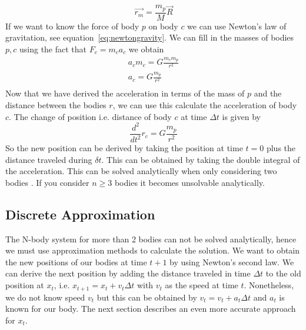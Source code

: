 \documentclass[11pt]{article} %
\begin{document}
\begin{equation}
	\overrightarrow{r_m} = \frac{m_p}{M}\overrightarrow{R}
\end{equation}
If we want to know the force of body $p$ on body $c$ we can use Newton's law of gravitation, see equation~\ref{eq:newtongravity}.  We can fill in the masses of bodies $p,c$ using the fact that $F_c = m_c a_c$ we obtain
\begin{equation}
    \begin{split}
     a_c m_c = G\frac{m_c m_p}{r^2} \\
     a_c = G\frac{m_p}{r^2} \\
    \end{split}
\end{equation}
Now that we have derived the acceleration in terms of the mass of $p$ and the distance between the bodies $r$, we can use this calculate the acceleration of body $c$. The change of position i.e. distance of body $c$ at time $\Delta t$ is given by
\begin{equation}
    \frac{d^2}{dt^2} r_c = G \frac{m_p}{r^2}
\end{equation}
So the new position can be derived by taking the position at time $t=0$ plus the distance traveled during $\delta t$. This can be obtained by taking the double integral of the acceleration. This can be solved analytically when only considering two bodies \cite{frida2013}. If you consider $n \geq 3$ bodies it becomes unsolvable analytically. 
\subsection{Discrete Approximation}
The N-body system for more than 2 bodies can not be solved analytically, hence we must use approximation methods to calculate the solution.
We want to obtain the new positions of our bodies at time $t+1$ by using Newton's second law. We can derive the next position by adding the distance traveled in time $\Delta t$ to the old position at $x_t$, i.e. $x_{t+1} = x_t + v_t\Delta t$ with $v_t$ as the speed at time $t$. Nonetheless, we do not know speed $v_t$ but this can be obtained by $v_t = v_t + a_t \Delta t$ and $a_t$ is known for our body. The next section describes an even more accurate approach for $x_t$.
\end{document}
